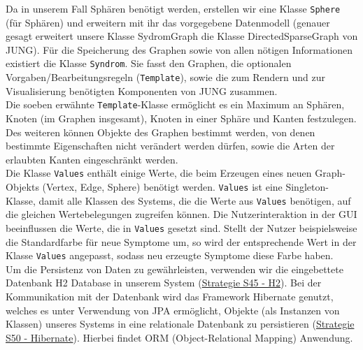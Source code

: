 \documentclass[enabledeprecatedfontcommands,fontsize=11pt,paper=a4,twoside]{scrartcl}
\newcounter{one}
\begin{document}
Da in unserem Fall Sphären benötigt werden, erstellen wir eine Klasse \texttt{Sphere} (für Sphären) und erweitern mit ihr das vorgegebene Datenmodell (genauer gesagt erweitert unsere Klasse SydromGraph die Klasse DirectedSparseGraph von JUNG). 
Für die Speicherung des Graphen sowie von allen nötigen Informationen existiert die Klasse \texttt{Syndrom}. Sie fasst den Graphen, die optionalen Vorgaben/Bearbeitungsregeln (\texttt{Template}), sowie die zum Rendern und zur Visualisierung benötigten Komponenten von JUNG zusammen. \\

Die soeben erwähnte \texttt{Template}-Klasse ermöglicht es ein Maximum an Sphären, Knoten (im Graphen insgesamt), Knoten in einer Sphäre und Kanten festzulegen. Des weiteren können Objekte des Graphen bestimmt werden, von denen bestimmte Eigenschaften nicht verändert werden dürfen, sowie die Arten der erlaubten Kanten eingeschränkt werden.\\

Die Klasse \texttt{Values} enthält einige Werte, die beim Erzeugen eines neuen Graph-Objekts (Vertex, Edge, Sphere) benötigt werden. \texttt{Values} ist eine Singleton-Klasse, damit alle Klassen des Systems, die die Werte aus \texttt{Values} benötigen, auf die gleichen Wertebelegungen zugreifen können. Die Nutzerinteraktion in der GUI beeinflussen die Werte, die in \texttt{Values} gesetzt sind. Stellt der Nutzer beispielsweise die Standardfarbe für neue Symptome um, so wird der entsprechende Wert in der Klasse \texttt{Values} angepasst, sodass neu erzeugte Symptome diese Farbe haben.\\

Um die Persistenz von Daten zu gewährleisten, verwenden wir die eingebettete Datenbank H2 Database in unserem System (\hyperlink{ppp}{Strategie S45 - H2}). Bei der Kommunikation mit der Datenbank wird das Framework Hibernate genutzt, welches es unter Verwendung von JPA ermöglicht, Objekte (als Instanzen von Klassen) unseres Systems in eine relationale Datenbank zu persistieren (\hyperlink{rrr}{Strategie S50 - Hibernate}). Hierbei findet ORM (Object-Relational Mapping) Anwendung. \\ 
\end{document}
